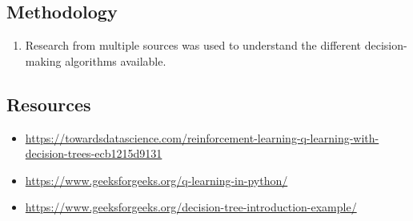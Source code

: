 \subsection*{Methodology}
\begin{enumerate}
    \item Research from multiple sources was used to understand the different decision-making algorithms available.
\end{enumerate}

\subsection*{Resources}
\begin{itemize}
    \item \url{https://towardsdatascience.com/reinforcement-learning-q-learning-with-decision-trees-ecb1215d9131}
    \item \url{https://www.geeksforgeeks.org/q-learning-in-python/}
    \item \url{https://www.geeksforgeeks.org/decision-tree-introduction-example/}
\end{itemize}

